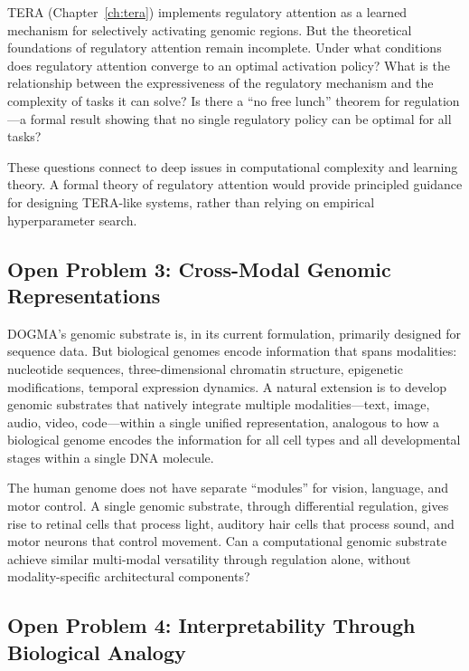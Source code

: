 TERA (Chapter~\ref{ch:tera}) implements regulatory attention as a learned mechanism for selectively activating genomic regions. But the theoretical foundations of regulatory attention remain incomplete. Under what conditions does regulatory attention converge to an optimal activation policy? What is the relationship between the expressiveness of the regulatory mechanism and the complexity of tasks it can solve? Is there a ``no free lunch'' theorem for regulation---a formal result showing that no single regulatory policy can be optimal for all tasks?

These questions connect to deep issues in computational complexity and learning theory. A formal theory of regulatory attention would provide principled guidance for designing TERA-like systems, rather than relying on empirical hyperparameter search.

\subsection{Open Problem 3: Cross-Modal Genomic Representations}

DOGMA's genomic substrate is, in its current formulation, primarily designed for sequence data. But biological genomes encode information that spans modalities: nucleotide sequences, three-dimensional chromatin structure, epigenetic modifications, temporal expression dynamics. A natural extension is to develop genomic substrates that natively integrate multiple modalities---text, image, audio, video, code---within a single unified representation, analogous to how a biological genome encodes the information for all cell types and all developmental stages within a single DNA molecule.

\begin{keyinsight}
The human genome does not have separate ``modules'' for vision, language, and motor control. A single genomic substrate, through differential regulation, gives rise to retinal cells that process light, auditory hair cells that process sound, and motor neurons that control movement. Can a computational genomic substrate achieve similar multi-modal versatility through regulation alone, without modality-specific architectural components?
\end{keyinsight}

\subsection{Open Problem 4: Interpretability Through Biological Analogy}


